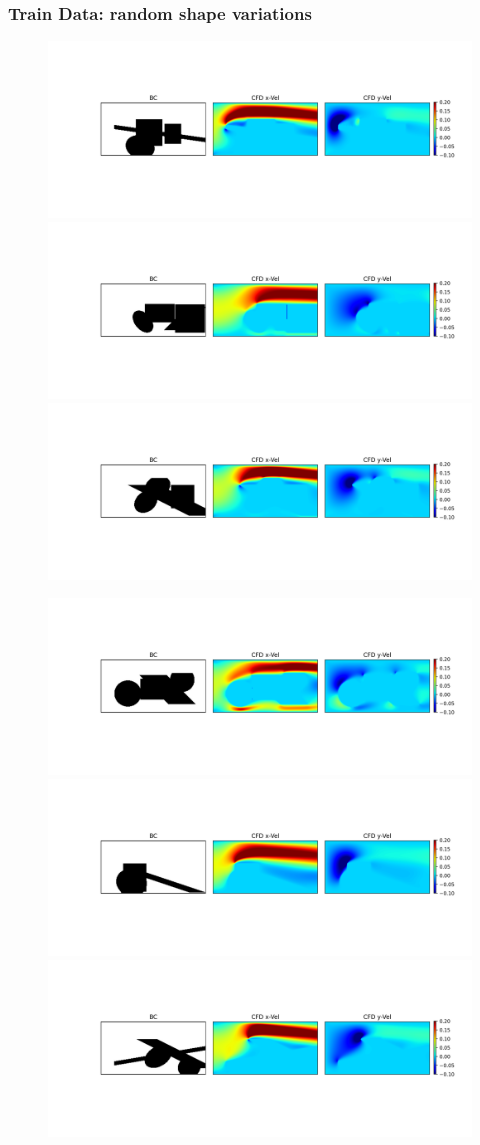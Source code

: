 \documentclass{beamer}
\begin{document}
\begin{frame}
\frametitle{Train Data: random shape variations}
\begin{figure}[h]
\vspace{0.4cm}
\includegraphics[height=0.16\linewidth, trim = 3.680cm 4.35cm 18.98cm 4.29cm, clip]{../../../plots/plots/train_data/montage_train_data_01.png}%
\includegraphics[height=0.16\linewidth, trim = 3.680cm 4.35cm 18.98cm 4.29cm, clip]{../../../plots/plots/train_data/montage_train_data_02.png}%
\includegraphics[height=0.16\linewidth, trim = 3.680cm 4.35cm 18.98cm 4.29cm, clip]{../../../plots/plots/train_data/montage_train_data_03.png}%

\includegraphics[height=0.16\linewidth, trim = 3.680cm 4.35cm 18.98cm 4.29cm, clip]{../../../plots/plots/train_data/montage_train_data_04.png}%
\includegraphics[height=0.16\linewidth, trim = 3.680cm 4.35cm 18.98cm 4.29cm, clip]{../../../plots/plots/train_data/montage_train_data_05.png}%
\includegraphics[height=0.16\linewidth, trim = 3.680cm 4.35cm 18.98cm 4.29cm, clip]{../../../plots/plots/train_data/montage_train_data_06.png}%


\end{figure}
\end{frame}
\end{document}
